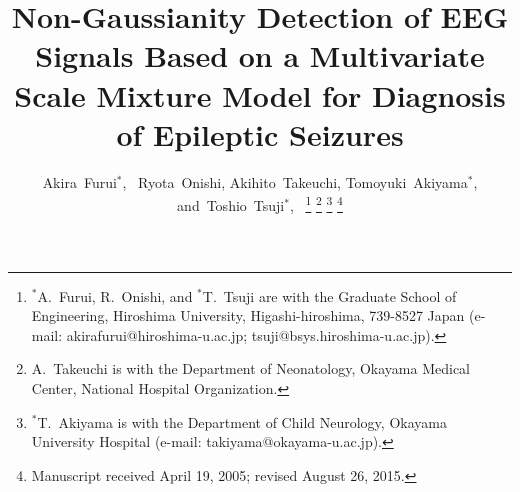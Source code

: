 \documentclass[journal]{IEEEtran}
\begin{document}
%
\title{Non-Gaussianity Detection of EEG Signals Based on a Multivariate Scale Mixture Model for Diagnosis of Epileptic Seizures}
%
%
%

\author{Akira~Furui${}^{*}$,~
        Ryota~Onishi,
        Akihito~Takeuchi,
        Tomoyuki~Akiyama${}^{*}$,
        and~Toshio~Tsuji${}^{*}$,~%
\thanks{${}^{*}$A.~Furui, R.~Onishi, and ${}^{*}$T.~Tsuji are with the Graduate School of Engineering, Hiroshima University, Higashi-hiroshima, 739-8527 Japan (e-mail: akirafurui@hiroshima-u.ac.jp; tsuji@bsys.hiroshima-u.ac.jp).}%
\thanks{A.~Takeuchi is with the Department of Neonatology, Okayama Medical Center, National Hospital Organization.}
\thanks{${}^{*}$T.~Akiyama is with the Department of Child Neurology, Okayama University Hospital (e-mail: takiyama@okayama-u.ac.jp).}%
\thanks{Manuscript received April 19, 2005; revised August 26, 2015.}}
%
%
\end{document}
